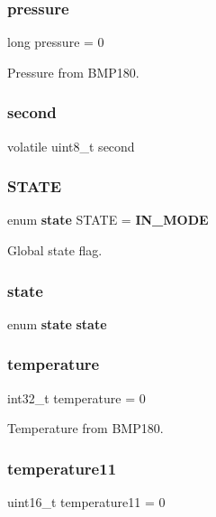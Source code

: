 \subsubsection{pressure}
{\footnotesize\ttfamily long pressure = 0}



Pressure from B\+M\+P180. 

\mbox{\label{main_8c_ae435761e09258eb177601c58bb79cbbc}} 
\subsubsection{second}
{\footnotesize\ttfamily volatile uint8\+\_\+t second}

\mbox{\label{main_8c_a003a9e0d98ce4b48357544cd0752a2f4}} 
\subsubsection{S\+T\+A\+TE}
{\footnotesize\ttfamily enum \textbf{ state} S\+T\+A\+TE = \textbf{ I\+N\+\_\+\+M\+O\+DE}}



Global state flag. 

\mbox{\label{main_8c_a72ac9d72742b75aa714400ece4c1d4ec}} 
\subsubsection{state}
{\footnotesize\ttfamily enum \textbf{ state}  \textbf{ state}}

\mbox{\label{main_8c_a015ae21dbf3e9d5aa583088391fd61ee}} 
\subsubsection{temperature}
{\footnotesize\ttfamily int32\+\_\+t temperature = 0}



Temperature from B\+M\+P180. 

\mbox{\label{main_8c_ab4de520f79a41c88d1a612ba677a452f}} 
\subsubsection{temperature11}
{\footnotesize\ttfamily uint16\+\_\+t temperature11 = 0}



